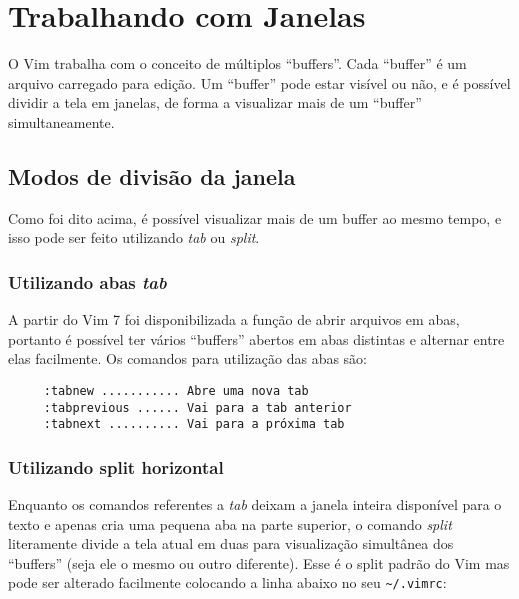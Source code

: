 
\chapter{Trabalhando com Janelas}\label{cha:Trabalhando com janelas}

O Vim trabalha com o conceito de múltiplos ``buffers''. Cada
``buffer'' é um arquivo carregado para edição. Um ``buffer'' pode
estar visível ou não, e é possível dividir a tela em janelas, de forma
a visualizar mais de um ``buffer'' simultaneamente. 

\section{Modos de divisão da janela}

Como foi dito acima, é possível visualizar mais de um buffer ao mesmo 
tempo, e isso pode ser feito utilizando {\em tab} ou {\em split}.


\subsection{Utilizando abas {\em tab}}

A partir do Vim 7 foi disponibilizada a função de abrir arquivos em
abas, portanto é possível ter vários ``buffers'' abertos em abas distintas
e alternar entre elas facilmente. Os comandos para utilização das abas
são:

\begin{verbatim}
     :tabnew ........... Abre uma nova tab
     :tabprevious ...... Vai para a tab anterior
     :tabnext .......... Vai para a próxima tab
\end{verbatim}


\subsection{Utilizando split horizontal}

Enquanto os comandos referentes a {\em tab} deixam a janela inteira disponível
para o texto e apenas cria uma pequena aba na parte superior, o comando {\em split} 
literamente divide a tela atual em duas para visualização simultânea
dos ``buffers'' (seja ele o mesmo ou outro diferente).
Esse é o split padrão do Vim mas pode ser alterado facilmente colocando a linha
abaixo no seu \verb|~/.vimrc|:


